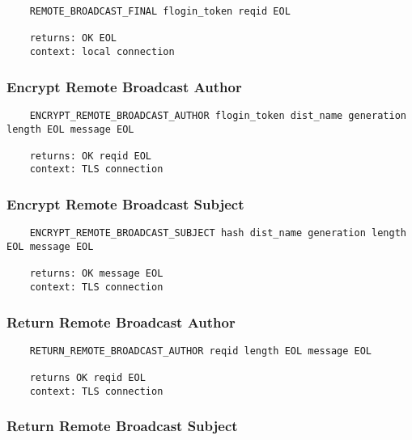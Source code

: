 \documentclass[letterpaper,11pt,oneside]{article}
\begin{document}
\vspace{10pt}
\begin{verbatim}
    REMOTE_BROADCAST_FINAL flogin_token reqid EOL 

    returns: OK EOL
    context: local connection
\end{verbatim}
\vspace{10pt}

\subsubsection{Encrypt Remote Broadcast Author}

\vspace{10pt}
\begin{verbatim}
    ENCRYPT_REMOTE_BROADCAST_AUTHOR flogin_token dist_name generation length EOL message EOL

    returns: OK reqid EOL
    context: TLS connection
\end{verbatim}
\vspace{10pt}

\subsubsection{Encrypt Remote Broadcast Subject}

\vspace{10pt}
\begin{verbatim}
    ENCRYPT_REMOTE_BROADCAST_SUBJECT hash dist_name generation length EOL message EOL

    returns: OK message EOL
    context: TLS connection
\end{verbatim}
\vspace{10pt}

\subsubsection{Return Remote Broadcast Author}

\vspace{10pt}
\begin{verbatim}
    RETURN_REMOTE_BROADCAST_AUTHOR reqid length EOL message EOL

    returns OK reqid EOL
    context: TLS connection
\end{verbatim}
\vspace{10pt}

\subsubsection{Return Remote Broadcast Subject}
\end{document}

